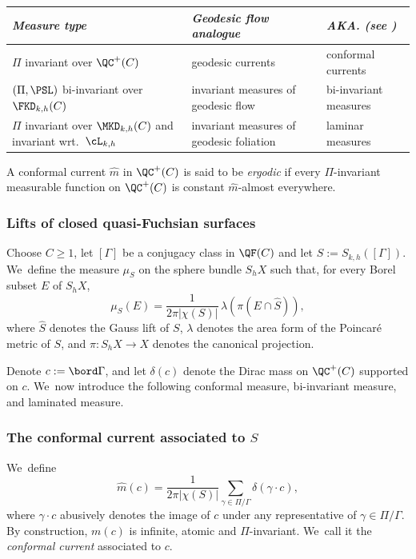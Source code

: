 \medskip
\begin{center}
\begin{tabularx}{\textwidth}{|>{\raggedright\arraybackslash}p{5cm}
|>{\raggedright\arraybackslash}X
|>{\raggedright\arraybackslash}X|}
\hline
\small\emph{Measure type} &
\small\emph{Geodesic flow analogue} &
\small\emph{AKA. (see \cite{LabourieBourbaki,MN_currents})} \\
\hline
\small $\Pi$ invariant over $\QC^+(C)$ &
\small geodesic currents &
\small conformal currents \\
\small $(\Pi,\PSL)$ bi-invariant over $\FKD_{k,h}(C)$ &
\small invariant measures of geodesic flow &
\small bi-invariant measures \\
\small $\Pi$ invariant over $\MKD_{k,h}(C)$ and invariant wrt.\ $\cL_{k,h}$ &
\small invariant measures of geodesic foliation &
\small laminar measures \\
\hline
\end{tabularx}
\end{center}

\begin{defi}
A conformal current $\hat m$ in $\QC^+(C)$ is said to be \emph{ergodic} if every $\Pi$-invariant measurable function on $\QC^+(C)$ is constant $\hat m$-almost everywhere.
\end{defi}

\subsubsection{Lifts of closed quasi-Fuchsian surfaces}\label{sss.lifts} Choose $C\geq 1$, let $[\Gamma]$ be a conjugacy class in $\QF(C)$ and let $S:=S_{k,h}([\Gamma])$. We~define the measure $\mu_S$ on the sphere bundle $S_h X$ such that, for every Borel subset $E$ of $S_h X$,
\begin{equation}\label{eq.inv_measure}
\mu_S(E)=\frac{1}{2\pi|\chi(S)|}\,\lambda(\pi(E\cap\hat S)),
\end{equation}
where $\hat S$ denotes the Gauss lift of $S$, $\lambda$ denotes the area form of the Poincaré metric of $S$, and $\pi:S_hX\to X$ denotes the canonical projection.

Denote $c:=\bord\Gamma$, and let $\delta(c)$ denote the Dirac mass on $\QC^+(C)$ supported on $c$. We~now introduce the following conformal measure, bi-invariant measure, and laminated measure.

\subsubsection*{The conformal current associated to $S$}
We~define
\begin{equation*}
\hat m(c)=\frac{1}{2\pi|\chi(S)|}\sum_{\gamma\in\Pi/\Gamma}\delta(\gamma\cdot c),
\end{equation*}
where $\gamma\cdot c$ abusively denotes the image of $c$ under any representative of $\gamma\in\Pi/\Gamma$. By construction, $m(c)$ is infinite, atomic and $\Pi$-invariant. We~call it the \emph{conformal current} associated to $c$.

